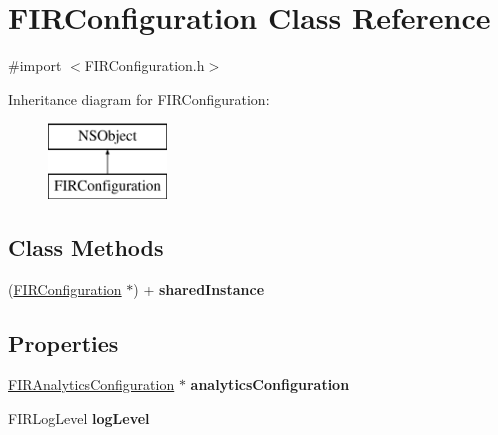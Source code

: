 \hypertarget{interface_f_i_r_configuration}{}\section{F\+I\+R\+Configuration Class Reference}
\label{interface_f_i_r_configuration}


{\ttfamily \#import $<$F\+I\+R\+Configuration.\+h$>$}

Inheritance diagram for F\+I\+R\+Configuration\+:\begin{figure}[H]
\begin{center}
\leavevmode
\includegraphics[height=2.000000cm]{interface_f_i_r_configuration}
\end{center}
\end{figure}
\subsection*{Class Methods}
\begin{DoxyCompactItemize}
\item 
\hypertarget{interface_f_i_r_configuration_a799959ad6b3c5a0f6eaae5e1e362bd05}{}(\hyperlink{interface_f_i_r_configuration}{F\+I\+R\+Configuration} $\ast$) + {\bfseries shared\+Instance}\label{interface_f_i_r_configuration_a799959ad6b3c5a0f6eaae5e1e362bd05}

\end{DoxyCompactItemize}
\subsection*{Properties}
\begin{DoxyCompactItemize}
\item 
\hypertarget{interface_f_i_r_configuration_a803efee93c8161330c621e1e1bf2996b}{}\hyperlink{interface_f_i_r_analytics_configuration}{F\+I\+R\+Analytics\+Configuration} $\ast$ {\bfseries analytics\+Configuration}\label{interface_f_i_r_configuration_a803efee93c8161330c621e1e1bf2996b}

\item 
\hypertarget{interface_f_i_r_configuration_aa2ff21059ae2572f9e4b8d1551040827}{}F\+I\+R\+Log\+Level {\bfseries log\+Level}\label{interface_f_i_r_configuration_aa2ff21059ae2572f9e4b8d1551040827}

\end{DoxyCompactItemize}


